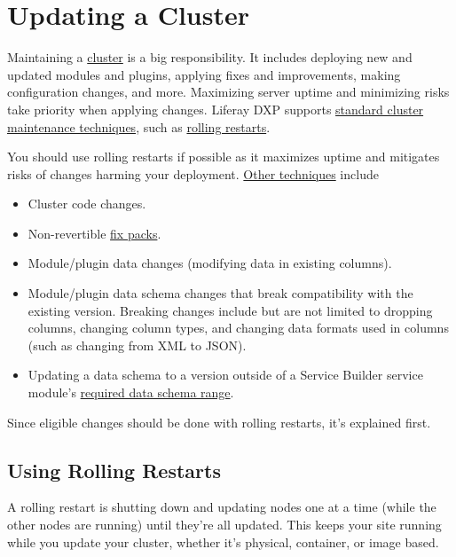 \chapter{Updating a Cluster}\label{updating-a-cluster}

Maintaining a
\href{/docs/7-0/deploy/-/knowledge_base/d/liferay-clustering}{cluster}
is a big responsibility. It includes deploying new and updated modules
and plugins, applying fixes and improvements, making configuration
changes, and more. Maximizing server uptime and minimizing risks take
priority when applying changes. Liferay DXP supports
\href{/docs/7-0/deploy/-/knowledge_base/d/other-cluster-update-techniques}{standard
cluster maintenance techniques}, such as
\href{/docs/7-0/deploy/-/knowledge_base/d/using-rolling-restarts}{rolling
restarts}.

You should use rolling restarts if possible as it maximizes uptime and
mitigates risks of changes harming your deployment.
\href{/docs/7-0/deploy/-/knowledge_base/d/other-cluster-update-techniques}{Other
techniques} include

\begin{itemize}
\tightlist
\item
  Cluster code changes.
\item
  Non-revertible
  \href{/docs/7-0/deploy/-/knowledge_base/d/maintaining-liferay}{fix
  packs}.
\item
  Module/plugin data changes (modifying data in existing columns).
\item
  Module/plugin data schema changes that break compatibility with the
  existing version. Breaking changes include but are not limited to
  dropping columns, changing column types, and changing data formats
  used in columns (such as changing from XML to JSON).
\item
  Updating a data schema to a version outside of a Service Builder
  service module's
  \href{/docs/7-0/tutorials/-/knowledge_base/t/creating-an-upgrade-process-for-your-app\#specifying-the-schema-version}{required
  data schema range}.
\end{itemize}

Since eligible changes should be done with rolling restarts, it's
explained first.

\section{Using Rolling Restarts}\label{using-rolling-restarts}

A rolling restart is shutting down and updating nodes one at a time
(while the other nodes are running) until they're all updated. This
keeps your site running while you update your cluster, whether it's
physical, container, or image based.

